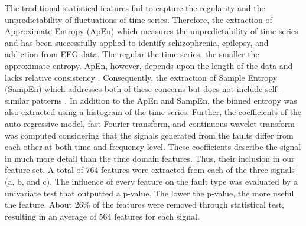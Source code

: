 \documentclass[conference]{IEEEtran}
\begin{document}
The traditional statistical features fail to capture the regularity and the unpredictability of fluctuations of time series. Therefore, the extraction of Approximate Entropy (ApEn) which measures the unpredictability of time series and has been successfully applied to identify schizophrenia, epilepsy, and addiction from EEG data. The regular the time series, the smaller the approximate entropy. ApEn, however, depends upon the length of the data and lacks relative consistency \cite{ApEnSampEn}. Consequently, the extraction of Sample Entropy (SampEn) which addresses both of these concerns but does not include self-similar patterns \cite{ApEnSampEn}. In addition to the ApEn and SampEn, the binned entropy was also extracted using a histogram of the time series. Further, the coefficients of the auto-regressive model, fast Fourier transform, and continuous wavelet transform was computed considering that the signals generated from the faults differ from each other at both time and frequency-level. These coefficients describe the signal in much more detail than the time domain features. Thus, their inclusion in our feature set. A total of 764 features were extracted from each of the three signals (a, b, and c). The influence of every feature on the fault type was evaluated by a univariate test that outputted a p-value. The lower the p-value, the more useful the feature. About 26\% of the features were removed through statistical test, resulting in an average of 564 features for each signal. 
\end{document}
